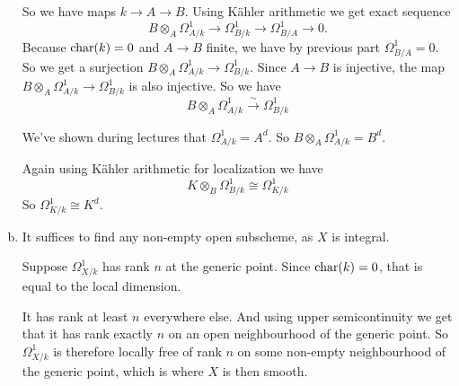 \begin{exercise}{2}
\begin{enumerate}[a)]
{                So we have maps $k \to A \to B$.
                Using Kähler arithmetic we get exact sequence
                \begin{equation*}
                    B \otimes_A \Omega^1_{A/k} \to \Omega^1_{B/k} \to
                    \Omega^1_{B/A} \to 0.
                \end{equation*}
                Because $\operatorname{char}(k) = 0$ and $A \to B$ finite, we have
                by previous part $\Omega^1_{B/A} = 0$. So we get a surjection $B
                \otimes_A \Omega^1_{A/k} \to \Omega^1_{B/k}$.
                Since $A \to B$ is injective, the map $B \otimes_A
                \Omega^1_{A/k} \to \Omega^1_{B/k}$ is also injective.
                So we have 
                \begin{equation*}
                    B \otimes_A \Omega^1_{A/k} \xrightarrow{\sim} \Omega^1_{B/k}
                \end{equation*}

                We've shown during lectures that $\Omega^1_{A/k} = A^d$.
                So $B \otimes_A \Omega^1_{A/k} = B^d$.

                Again using Kähler arithmetic for localization we have
                \begin{equation*}
                    K \otimes_B \Omega^1_{B/k} \cong \Omega^1_{K/k}
                \end{equation*}
                So $\Omega^1_{K/k} \cong K^d$.
            }
        \item{
                It suffices to find any non-empty open subscheme, as $X$ is
                integral.

                Suppose $\Omega^1_{X/k}$ has rank $n$ at the generic point.
                Since $\operatorname{char}(k) = 0$, that is equal to the local
                dimension.

                It has rank at least $n$ everywhere else. And using upper
                semicontinuity we get that it has rank exactly $n$ on an open
                neighbourhood of the generic point. So $\Omega^1_{X/k}$ is
                therefore locally free of rank $n$ on some non-empty
                neighbourhood of the generic point, which is where $X$ is then
                smooth.
            }
    \end{enumerate}
\end{exercise}



